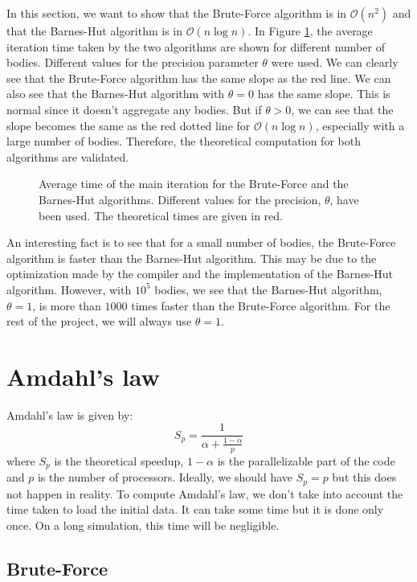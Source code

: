 \documentclass[10pt,a4paper]{article}
\begin{document}
In this section, we want to show that the Brute-Force algorithm is in $\mathcal{O}(n^2)$ and that the Barnes-Hut algorithm is in $\mathcal{O}(n\log n)$. In Figure \ref{fig:algo_time}, the average iteration time taken by the two algorithms are shown for different number of bodies. Different values for the precision parameter $\theta$ were used. We can clearly see that the Brute-Force algorithm has the same slope as the red line. We can also see that the Barnes-Hut algorithm with $\theta=0$ has the same slope. This is normal since it doesn't aggregate any bodies. But if $\theta>0$, we can see that the slope becomes the same as the red dotted line for $\mathcal{O}(n\log n)$, especially with a large number of bodies. Therefore, the theoretical computation for both algorithms are validated.

\begin{figure}[H]
\centering

\caption{\label{fig:algo_time} Average time of the main iteration for the Brute-Force and the Barnes-Hut algorithms. Different values for the precision, $\theta$, have been used. The theoretical times are given in red.}
\end{figure}

An interesting fact is to see that for a small number of bodies, the Brute-Force algorithm is faster than the Barnes-Hut algorithm. This may be due to the optimization made by the compiler and the implementation of the Barnes-Hut algorithm. However, with $10^5$ bodies, we see that the Barnes-Hut algorithm, $\theta=1$, is more than $1000$ times faster than the Brute-Force algorithm. For the rest of the project, we will always use $\theta=1$.

\section{Amdahl's law}

Amdahl's law is given by:
\begin{equation}
S_{p} = \frac{1}{\alpha + \frac{1-\alpha}{p}}
\end{equation}
where $S_{p}$ is the theoretical speedup, $1-\alpha$ is the parallelizable part of the code and $p$ is the number of processors. Ideally, we should have $S_p = p$ but this does not happen in reality. To compute Amdahl's law, we don't take into account the time taken to load the initial data. It can take some time but it is done only once. On a long simulation, this time will be negligible.

\subsection{Brute-Force}
\end{document}
